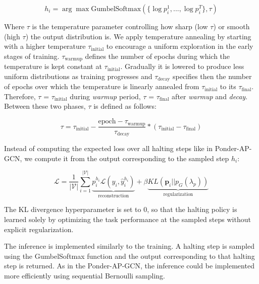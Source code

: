 \documentclass{gdl}
\begin{document}
\begin{equation}
    h_i = \arg\max \text{GumbelSoftmax}(\{\log p_i^1,...,\log p_i^{T}\}, \tau)
\end{equation}

\noindent Where $\tau$ is the temperature parameter controlling how sharp (low $\tau$) or smooth (high $\tau$) the output distribution is. We apply temperature annealing by starting with a higher temperature $\tau_{\text{initial}}$ to encourage a uniform exploration in the early stages of training. $\tau_{\text{warmup}}$ defines the number of epochs during which the temperature is kept constant at $\tau_{\text{initial}}$. Gradually it is lowered to produce less uniform distributions as training progresses and $\tau_{\text{decay}}$ specifies then the number of epochs over which the temperature is linearly annealed from $\tau_{\text{initial}}$ to its $\tau_{\text{final}}$.
Therefore, $\tau$ = $\tau_{\text{initial}}$ during \textit{warmup} period, $\tau$ = $\tau_{\text{final}}$ after \textit{warmup} and \textit{decay}. Between these two phases, $\tau$ is defined as follows:

\begin{equation}
\tau = \tau_{\text{initial}} - \frac{\text{epoch} - \tau_{\text{warmup}}}{\tau_{\text{decay}}}  * (\tau_{\text{initial}} - \tau_{\text{final}})
\end{equation}

Instead of computing the expected loss over all halting steps like in Ponder-AP-GCN, we compute it from the output corresponding to the sampled step $h_i$:

\begin{equation}
\mathcal{L} = \frac{1}{|\mathcal{V}|} \sum_{i=1}^{\mathcal{|V|}} \underbrace{p_i^{h_i} \mathcal{L}(y_i, \hat{y}_i^{h_i})}_{\text{reconstruction}} + \beta \underbrace{KL(\mathbf{p}_i || p_G(\lambda_p))}_{\text{regularization}}
\end{equation}

\noindent The KL divergence hyperparameter is set to 0, so that the halting policy is learned solely by optimizing the task performance at the sampled steps without explicit regularization. 

The inference is implemented similarly to the training. A halting step is sampled using the GumbelSoftmax function and the output corresponding to that halting step is returned. As in the Ponder-AP-GCN, the inference could be implemented more efficiently using sequential Bernoulli sampling.
\end{document}
